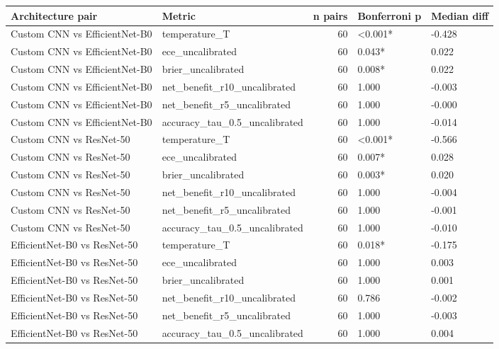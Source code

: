 \begin{tabular}{llrll}
\toprule
Architecture pair & Metric & n pairs & Bonferroni p & Median diff \\
\midrule
Custom CNN vs EfficientNet-B0 & temperature_T & 60 & <0.001* & -0.428 \\
Custom CNN vs EfficientNet-B0 & ece_uncalibrated & 60 & 0.043* & 0.022 \\
Custom CNN vs EfficientNet-B0 & brier_uncalibrated & 60 & 0.008* & 0.022 \\
Custom CNN vs EfficientNet-B0 & net_benefit_r10_uncalibrated & 60 & 1.000 & -0.003 \\
Custom CNN vs EfficientNet-B0 & net_benefit_r5_uncalibrated & 60 & 1.000 & -0.000 \\
Custom CNN vs EfficientNet-B0 & accuracy_tau_0.5_uncalibrated & 60 & 1.000 & -0.014 \\
Custom CNN vs ResNet-50 & temperature_T & 60 & <0.001* & -0.566 \\
Custom CNN vs ResNet-50 & ece_uncalibrated & 60 & 0.007* & 0.028 \\
Custom CNN vs ResNet-50 & brier_uncalibrated & 60 & 0.003* & 0.020 \\
Custom CNN vs ResNet-50 & net_benefit_r10_uncalibrated & 60 & 1.000 & -0.004 \\
Custom CNN vs ResNet-50 & net_benefit_r5_uncalibrated & 60 & 1.000 & -0.001 \\
Custom CNN vs ResNet-50 & accuracy_tau_0.5_uncalibrated & 60 & 1.000 & -0.010 \\
EfficientNet-B0 vs ResNet-50 & temperature_T & 60 & 0.018* & -0.175 \\
EfficientNet-B0 vs ResNet-50 & ece_uncalibrated & 60 & 1.000 & 0.003 \\
EfficientNet-B0 vs ResNet-50 & brier_uncalibrated & 60 & 1.000 & 0.001 \\
EfficientNet-B0 vs ResNet-50 & net_benefit_r10_uncalibrated & 60 & 0.786 & -0.002 \\
EfficientNet-B0 vs ResNet-50 & net_benefit_r5_uncalibrated & 60 & 1.000 & -0.003 \\
EfficientNet-B0 vs ResNet-50 & accuracy_tau_0.5_uncalibrated & 60 & 1.000 & 0.004 \\
\bottomrule
\end{tabular}
